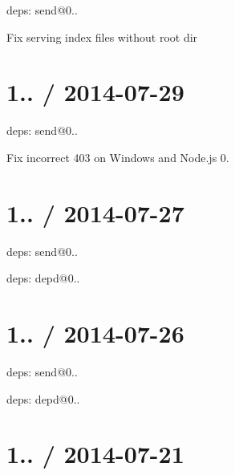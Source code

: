 \begin{DoxyItemize}
\item deps\+: send@0..
\begin{DoxyItemize}
\item Fix serving index files without root dir
\end{DoxyItemize}
\end{DoxyItemize}

\section*{1.. / 2014-\/07-\/29 }


\begin{DoxyItemize}
\item deps\+: send@0..
\begin{DoxyItemize}
\item Fix incorrect 403 on Windows and Node.\+js 0.
\end{DoxyItemize}
\end{DoxyItemize}

\section*{1.. / 2014-\/07-\/27 }


\begin{DoxyItemize}
\item deps\+: send@0..
\begin{DoxyItemize}
\item deps\+: depd@0..
\end{DoxyItemize}
\end{DoxyItemize}

\section*{1.. / 2014-\/07-\/26 }


\begin{DoxyItemize}
\item deps\+: send@0..
\begin{DoxyItemize}
\item deps\+: depd@0..
\end{DoxyItemize}
\end{DoxyItemize}

\section*{1.. / 2014-\/07-\/21 }


